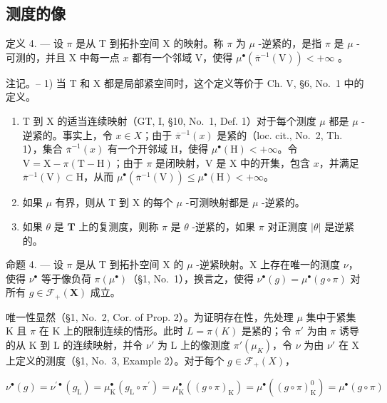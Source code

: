 \subsection{测度的像}

定义 4. --- 设 \(\pi\) 是从 T 到拓扑空间 X 的映射。称 \(\pi\) 为 \(\mu\) -逆紧的，是指 \(\pi\) 是 \(\mu\) -可测的，并且 X 中每一点 \(x\) 都有一个邻域 V，使得 \(\mu^{\bullet}\left(\overline{\pi}^{-1}(\mathrm{V})\right) < +\infty\) 。

注记。-- 1) 当 T 和 X 都是局部紧空间时，这个定义等价于 Ch. V, §6, No.~1 中的定义。

\begin{enumerate}
\def\labelenumi{\arabic{enumi})}
\setcounter{enumi}{1}
\item
  T 到 X 的适当连续映射（GT, I, §10, No.~1, Def. 1）对于每个测度 \(\mu\) 都是 \(\mu\) -逆紧的。事实上，令 \(x \in X\)；由于 \(\overline{\pi}^{-1}(x)\) 是紧的（loc. cit., No.~2, Th. 1），集合 \(\overline{\pi}^{-1}(x)\) 有一个开邻域 H，使得 \(\mu^{\bullet}(\mathrm{H}) < +\infty\)。令 \(\mathrm{V} = \mathrm{X} - \pi(\mathrm{T} - \mathrm{H})\)；由于 \(\pi\) 是闭映射，V 是 X 中的开集，包含 \(x\)，并满足 \(\overline{\pi}^{-1}(\mathrm{V}) \subset \mathrm{H}\)，从而 \(\mu^{\bullet}(\overline{\pi}^{-1}(\mathrm{V})) \leqslant \mu^{\bullet}(\mathrm{H}) < +\infty\)。
\item
  如果 \(\mu\) 有界，则从 T 到 X 的每个 \(\mu\) -可测映射都是 \(\mu\) -逆紧的。
\item
  如果 \(\theta\) 是 \(\mathbf{T}\) 上的复测度，则称 \(\pi\) 是 \(\theta\) -逆紧的，如果 \(\pi\) 对正测度 \(|\theta|\) 是逆紧的。
\end{enumerate}

命题 4. --- 设 \(\pi\) 是从 T 到拓扑空间 X 的 \(\mu\) -逆紧映射。X 上存在唯一的测度 \(\nu\)，使得 \(\nu^{\bullet}\) 等于像负荷 \(\pi(\mu^{\bullet})\)（§1, No.~1），换言之，使得 \(\nu^{\bullet}(g) = \mu^{\bullet}(g \circ \pi)\) 对所有 \(g \in \mathcal{F}_{+}(\mathbf{X})\) 成立。

唯一性显然（§1, No.~2, Cor. of Prop. 2）。为证明存在性，先处理 \(\mu\) 集中于紧集 K 且 \(\pi\) 在 K 上的限制连续的情形。此时 \(L = \pi(K)\) 是紧的；令 \(\pi'\) 为由 \(\pi\) 诱导的从 K 到 L 的连续映射，并令 \(\nu'\) 为 L 上的像测度 \(\pi'(\mu_K)\)，令 \(\nu\) 为由 \(\nu'\) 在 X 上定义的测度（§1, No.~3, Example 2）。对于每个 \(g \in \mathcal{F}_+(X)\)，

\[
\nu^ {\bullet} (g) = \nu^ {\prime \bullet} (g _ {\mathrm{L}}) = \mu_ {\mathrm{K}} ^ {\bullet} (g _ {\mathrm{L}} \circ \pi^ {\prime}) = \mu_ {\mathrm{K}} ^ {\bullet} ((g \circ \pi) _ {\mathrm{K}}) = \mu^ {\bullet} ((g \circ \pi) _ {\mathrm{K}} ^ {0}) = \mu^ {\bullet} (g \circ \pi)
\]

